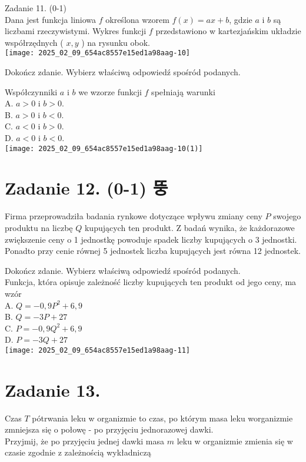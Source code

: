 \documentclass[10pt]{article}
\begin{document}
Zadanie 11. (0-1)\\
Dana jest funkcja liniowa \(f\) określona wzorem \(f(x)=a x+b\), gdzie \(a\) i \(b\) są liczbami rzeczywistymi. Wykres funkcji \(f\) przedstawiono w kartezjańskim układzie współrzędnych ( \(x, y\) ) na rysunku obok.\\
\texttt{[image: 2025\_02\_09\_654ac8557e15ed1a98aag-10]}

Dokończ zdanie. Wybierz właściwą odpowiedź spośród podanych.

Współczynniki \(a\) i \(b\) we wzorze funkcji \(f\) spełniają warunki\\
A. \(a>0\) i \(b>0\).\\
B. \(a>0\) i \(b<0\).\\
C. \(a<0\) i \(b>0\).\\
D. \(a<0\) i \(b<0\).\\
\texttt{[image: 2025\_02\_09\_654ac8557e15ed1a98aag-10(1)]}

\section*{Zadanie 12. (0-1) 뚱}
Firma przeprowadziła badania rynkowe dotyczące wpływu zmiany ceny \(P\) swojego produktu na liczbę \(Q\) kupujących ten produkt. Z badań wynika, że każdorazowe zwiększenie ceny o 1 jednostkę powoduje spadek liczby kupujących o 3 jednostki. Ponadto przy cenie równej 5 jednostek liczba kupujących jest równa 12 jednostek.

Dokończ zdanie. Wybierz właściwą odpowiedź spośród podanych.\\
Funkcja, która opisuje zależność liczby kupujących ten produkt od jego ceny, ma wzór\\
A. \(Q=-0,9 P^{2}+6,9\)\\
B. \(Q=-3 P+27\)\\
C. \(P=-0,9 Q^{2}+6,9\)\\
D. \(P=-3 Q+27\)\\
\texttt{[image: 2025\_02\_09\_654ac8557e15ed1a98aag-11]}

\section*{Zadanie 13.}
Czas \(T\) pótrwania leku w organizmie to czas, po którym masa leku worganizmie zmniejsza się o połowę - po przyjęciu jednorazowej dawki.\\
Przyjmij, że po przyjęciu jednej dawki masa \(m\) leku w organizmie zmienia się w czasie zgodnie z zależnością wykładniczą
\end{document}
